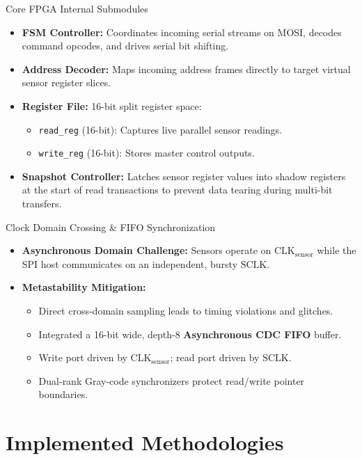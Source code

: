 \documentclass{beamer}
\begin{document}
\begin{frame}{Core FPGA Internal Submodules}
  \begin{itemize}
    \item \textbf{FSM Controller:} Coordinates incoming serial streams on MOSI, decodes command opcodes, and drives serial bit shifting.
    \item \textbf{Address Decoder:} Maps incoming address frames directly to target virtual sensor register slices.
    \item \textbf{Register File:} 16-bit split register space:
    \begin{itemize}
      \item \texttt{read\_reg} (16-bit): Captures live parallel sensor readings.
      \item \texttt{write\_reg} (16-bit): Stores master control outputs.
    \end{itemize}
    \item \textbf{Snapshot Controller:} Latches sensor register values into shadow registers at the start of read transactions to prevent data tearing during multi-bit transfers.
  \end{itemize}
\end{frame}

\begin{frame}{Clock Domain Crossing \& FIFO Synchronization}
  \begin{itemize}
    \item \textbf{Asynchronous Domain Challenge:} Sensors operate on $\text{CLK}_{\text{sensor}}$ while the SPI host communicates on an independent, bursty $\text{SCLK}$.
    \item \textbf{Metastability Mitigation:} 
    \begin{itemize}
      \item Direct cross-domain sampling leads to timing violations and glitches.
      \item Integrated a 16-bit wide, depth-8 \textbf{Asynchronous CDC FIFO} buffer.
      \item Write port driven by $\text{CLK}_{\text{sensor}}$; read port driven by $\text{SCLK}$.
      \item Dual-rank Gray-code synchronizers protect read/write pointer boundaries.
    \end{itemize}
  \end{itemize}
\end{frame}

\section{Implemented Methodologies}
\end{document}
